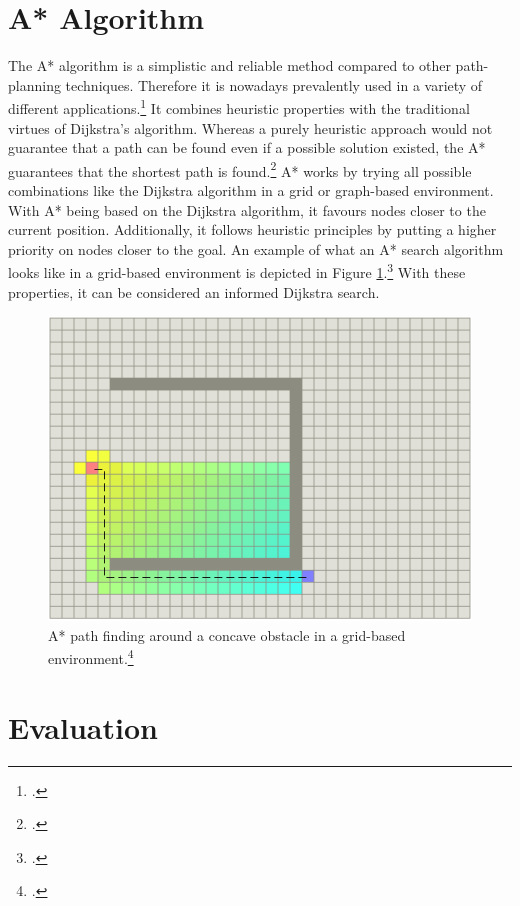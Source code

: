 \section{A* Algorithm}

The A* algorithm is a simplistic and reliable method compared to other path-planning techniques. Therefore it is nowadays prevalently used in a variety of different applications.\footcite{Zammit2018}\newline
It combines heuristic properties with the traditional virtues of Dijkstra's algorithm. Whereas a purely heuristic approach would not guarantee that a path can be found even if a possible solution existed, the A* guarantees that the shortest path is found.\footcite{Sathyaraj2008}
A* works by trying all possible combinations like the Dijkstra algorithm in a grid or graph-based environment. With A* being based on the Dijkstra algorithm, it favours nodes closer to the current position. Additionally, it follows heuristic principles by putting a higher priority on nodes closer to the goal. An example of what an A* search algorithm looks like in a grid-based environment is depicted in Figure \ref{fig:path_planning_Astar}.\footcite{standfordAStarComparison1997}\newline
With these properties, it can be considered an informed Dijkstra search.
  
\begin{figure}[h]
	\centering
	\includegraphics[width=0.7\linewidth]{img/AStarExample}
	\caption{A* path finding around a concave obstacle in a grid-based environment.\footcite{standfordAStarComparison1997}}
	\label{fig:path_planning_Astar}
\end{figure}

\section{Evaluation}

